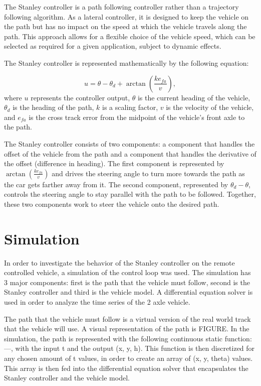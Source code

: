 \documentclass[arbeit=studie,oneside,BCOR=12mm]{ArbeitRST}
\begin{document}
The Stanley controller is a path following controller rather than a trajectory
following algorithm. As a lateral controller, it is designed to keep the
vehicle on the path but has no impact on the speed at which the vehicle travels
along the path. This approach allows for a flexible choice of the vehicle
speed, which can be selected as required for a given application, subject to
dynamic effects.

The Stanley controller is represented mathematically by the following equation:

\begin{equation}
  u = \theta - \theta_d + \arctan\left(\frac{ke_{fa}}{v}\right),
  \label{eq:Stanley-Regler}
\end{equation}
where $u$ represents the controller output, $\theta$ is the current heading of
the vehicle, $\theta_d$ is the heading of the path, $k$ is a scaling factor,
$v$ is the velocity of the vehicle, and $e_{fa}$ is the cross track error from
the midpoint of the vehicle's front axle to the path.

The Stanley controller consists of two components: a component that handles the
offset of the vehicle from the path and a component that handles the derivative
of the offset (difference in heading). The first component is represented by
$\arctan(\frac{ke_{fa}}{v})$ and drives the steering angle to turn more towards
the path as the car gets farther away from it. The second component,
represented by $\theta_d - \theta$, controls the steering angle to stay
parallel with the path to be followed. Together, these two components work to
steer the vehicle onto the desired path.


\section{Simulation}
In order to investigate the behavior of the Stanley controller on the remote
controlled vehicle, a simulation of the control loop was used. The simulation
has 3 major components: first is the path that the vehicle must follow, second
is the Stanley controller and third is the vehicle model. A differential
equation solver is used in order to analyze the time series of the 2 axle
vehicle. 

The path that the vehicle must follow is a virtual version of the real world
track that the vehicle will use. A visual representation of the path is FIGURE.
In the simulation, the path is represented with the following continuous static
function: 
---, 
with the input t and the output (x, y, h). This function is
then discretized for any chosen amount of t values, in order to create an array
of (x, y, theta) values. This array is then fed into the differential equation
solver that encapsulates the Stanley controller and the vehicle model. 
\end{document}
